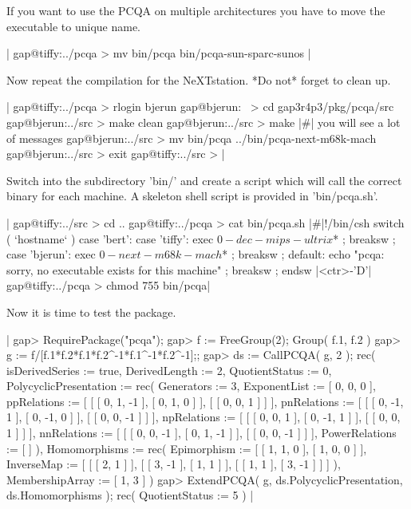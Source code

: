 If you want to use  the PCQA on  multiple architectures you have to  move
the executable to unique name.

|    gap@tiffy:../pcqa > mv bin/pcqa bin/pcqa-sun-sparc-sunos |

Now repeat the compilation  for the NeXTstation. *Do not* forget to clean
up.

|    gap@tiffy:../pcqa > rlogin bjerun
    gap@bjerun:~ > cd gap3r4p3/pkg/pcqa/src
    gap@bjerun:../src > make clean
    gap@bjerun:../src > make
    |\#| you will see a lot of messages
    gap@bjerun:../src > mv bin/pcqa ../bin/pcqa-next-m68k-mach
    gap@bjerun:../src > exit
    gap@tiffy:../src > |

Switch into the  subdirectory 'bin/' and  create a script which will call
the correct binary for each machine.  A skeleton shell script is provided
in 'bin/pcqa.sh'.

|    gap@tiffy:../src > cd ..
    gap@tiffy:../pcqa > cat bin/pcqa.sh
    |\#|!/bin/csh
    switch ( `hostname` )
      case 'bert':
      case 'tiffy':
        exec $0-dec-mips-ultrix $* ;
        breaksw ;
      case 'bjerun':
        exec $0-next-m68k-mach $* ;
        breaksw ;
      default:
        echo "pcqa: sorry, no executable exists for this machine" ;
        breaksw ;
    endsw
    |<ctr>-'D'|
    gap@tiffy:../pcqa > chmod 755 bin/pcqa|

Now it is time to test the package.

|    gap> RequirePackage("pcqa");
    gap> f := FreeGroup(2);
    Group( f.1, f.2 )
    gap> g := f/[f.1*f.2*f.1*f.2^-1*f.1^-1*f.2^-1];;
    gap> ds := CallPCQA( g, 2 );
    rec(
      isDerivedSeries := true,
      DerivedLength := 2,
      QuotientStatus := 0,
      PolycyclicPresentation := rec(
	  Generators := 3,
	  ExponentList := [ 0, 0, 0 ],
	  ppRelations := [ [ [ 0, 1, -1 ], [ 0, 1, 0 ] ],
	                   [ [ 0, 0, 1 ] ] ],
	  pnRelations := [ [ [ 0, -1, 1 ], [ 0, -1, 0 ] ],
	                   [ [ 0, 0, -1 ] ] ],
	  npRelations := [ [ [ 0, 0, 1 ], [ 0, -1, 1 ] ],
	                   [ [ 0, 0, 1 ] ] ],
	  nnRelations := [ [ [ 0, 0, -1 ], [ 0, 1, -1 ] ],
	                   [ [ 0, 0, -1 ] ] ],
	  PowerRelations := [  ] ),
      Homomorphisms := rec(
	  Epimorphism := [ [ 1, 1, 0 ], [ 1, 0, 0 ] ],
	  InverseMap := [ [ [ 2, 1 ] ], [ [ 3, -1 ], [ 1, 1 ] ],
	                  [ [ 1, 1 ], [ 3, -1 ] ] ] ),
      MembershipArray := [ 1, 3 ] )
    gap> ExtendPCQA( g, ds.PolycyclicPresentation, ds.Homomorphisms );
    rec(
        QuotientStatus := 5 ) |

